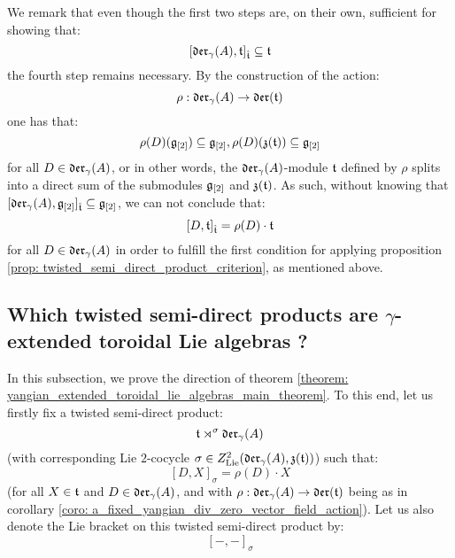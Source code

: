 \begin{itemize}
\begin{enumerate}
            \end{enumerate}
            We remark that even though the first two steps are, on their own, sufficient for showing that:
                $$[\mathfrak{der}_{\gamma}(A), \mathfrak{t}]_{\hat{\mathfrak{t}}} \subseteq \mathfrak{t}$$
            the fourth step remains necessary. By the construction of the action:
                $$\rho: \mathfrak{der}_{\gamma}(A) \to \mathfrak{der}(\mathfrak{t})$$
            one has that:
                $$\rho(D)(\mathfrak{g}_{[2]}) \subseteq \mathfrak{g}_{[2]}, \rho(D)(\mathfrak{z}(\mathfrak{t})) \subseteq \mathfrak{g}_{[2]}$$
            for all $D \in \mathfrak{der}_{\gamma}(A)$, or in other words, the $\mathfrak{der}_{\gamma}(A)$-module $\mathfrak{t}$ defined by $\rho$ splits into a direct sum of the submodules $\mathfrak{g}_{[2]}$ and $\mathfrak{z}(\mathfrak{t})$. As such, without knowing that $[\mathfrak{der}_{\gamma}(A), \mathfrak{g}_{[2]}]_{\hat{\mathfrak{t}}} \subseteq \mathfrak{g}_{[2]}$, we can not conclude that:
                $$[D, \mathfrak{t}]_{\hat{\mathfrak{t}}} = \rho(D) \cdot \mathfrak{t}$$
            for all $D \in \mathfrak{der}_{\gamma}(A)$ in order to fulfill the first condition for applying proposition \ref{prop: twisted_semi_direct_product_criterion}, as mentioned above.
        \end{itemize}

    \subsection{Which twisted semi-direct products are \texorpdfstring{$\gamma$}{}-extended toroidal Lie algebras ?} \label{subsection: which_twisted_semi_direct_products_are_yangian_extended_toroidal_lie_algebras}
        In this subsection, we prove the  direction of theorem \ref{theorem: yangian_extended_toroidal_lie_algebras_main_theorem}. To this end, let us firstly fix a twisted semi-direct product:
            $$\mathfrak{t} \rtimes^{\sigma} \mathfrak{der}_{\gamma}(A)$$
        (with corresponding Lie $2$-cocycle $\sigma \in Z^2_{\mathrm{Lie}}(\mathfrak{der}_{\gamma}(A), \mathfrak{z}(\mathfrak{t}))$) such that:
            $$[D, X]_{\sigma} = \rho(D) \cdot X$$
        (for all $X \in \mathfrak{t}$ and $D \in \mathfrak{der}_{\gamma}(A)$, and with $\rho: \mathfrak{der}_{\gamma}(A) \to \mathfrak{der}(\mathfrak{t})$ being as in corollary \ref{coro: a_fixed_yangian_div_zero_vector_field_action}). Let us also denote the Lie bracket on this twisted semi-direct product by:
            $$[-, -]_{\sigma}$$

